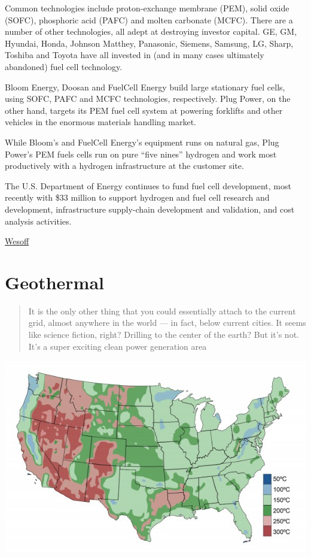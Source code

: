 \documentclass[
]{book}
\begin{document}
Common technologies include proton-exchange membrane (PEM), solid oxide (SOFC), phosphoric acid (PAFC) and molten carbonate (MCFC). There are a number of other technologies, all adept at destroying investor capital. GE, GM, Hyundai, Honda, Johnson Matthey, Panasonic, Siemens, Samsung, LG, Sharp, Toshiba and Toyota have all invested in (and in many cases ultimately abandoned) fuel cell technology.

Bloom Energy, Doosan and FuelCell Energy build large stationary fuel cells, using SOFC, PAFC and MCFC technologies, respectively. Plug Power, on the other hand, targets its PEM fuel cell system at powering forklifts and other vehicles in the enormous materials handling market.

While Bloom's and FuelCell Energy's equipment runs on natural gas, Plug Power's PEM fuels cells run on pure ``five nines'' hydrogen and work most productively with a hydrogen infrastructure at the customer site.

The U.S. Department of Energy continues to fund fuel cell development, most recently with \$33 million to support hydrogen and fuel cell research and development, infrastructure supply-chain development and validation, and cost analysis activities.

\href{https://www.canarymedia.com/articles/chart-of-the-day-fuel-cell-industry-profits/}{Wesoff}

\hypertarget{geothermal}{%
\chapter{Geothermal}\label{geothermal}}

\begin{quote}
It is the only other thing that you could essentially attach to the current grid, almost anywhere in the world --- in fact, below current cities. It seems like science fiction, right? Drilling to the center of the earth? But it's not. It's a super exciting clean power generation area
\end{quote}

\includegraphics{fig/geothermal_US_10km.png}
\end{document}
